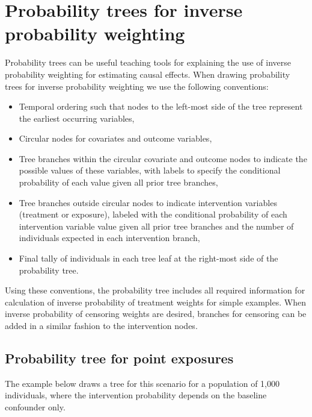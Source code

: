 \documentclass[a4paper]{report}
\begin{document}
\newpage

\chapter{Probability trees for inverse probability weighting}
Probability trees can be useful teaching tools for explaining the use of inverse probability weighting for estimating causal effects. When drawing probability trees for inverse probability weighting we use the following conventions:
\begin{itemize}

\item Temporal ordering such that nodes to the left-most side of the tree represent the earliest occurring variables, 

\item Circular nodes for covariates and outcome variables,

\item Tree branches within the circular covariate and outcome nodes to indicate the possible values of these variables, with labels to specify the conditional probability of each value given all prior tree branches, 

\item Tree branches outside circular nodes to indicate intervention variables (treatment or exposure), labeled with the conditional probability of each intervention variable value given all prior tree branches and the number of individuals expected in each intervention branch, 

\item Final tally of individuals in each tree leaf at the right-most side of the probability tree. 

\end{itemize}

Using these conventions, the probability tree includes all required information for calculation of inverse probability of treatment weights for simple examples. When inverse probability of censoring weights are desired, branches for censoring can be added in a similar fashion to the intervention nodes.

\newpage

\section{Probability tree for point exposures}

The example below draws a tree for this scenario for a population of 1,000 individuals, where the intervention probability depends on the baseline confounder only.
\end{document}
